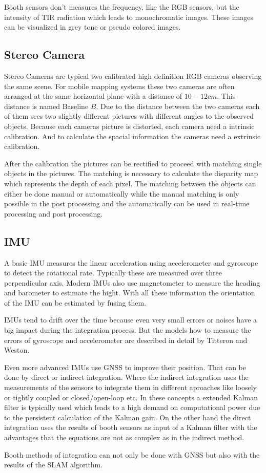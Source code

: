 Booth sensors don't measures the frequency, like the RGB sensors, but the intensity of \ac{TIR} radiation which leads to monochromatic images.
These images can be visualized in grey tone or pseudo colored images.

\subsection{Stereo Camera}\label{ssec:stereoCamera}
Stereo Cameras are typical two calibrated high definition RGB cameras observing the same scene.
For mobile mapping systems these two cameras are often arranged at the same horizontal plane with a distance of $10-12\si{cm}$.
This distance is named Baseline $B$.
Due to the distance between the two cameras each of them sees two slightly different pictures with different angles to the observed objects.
Because each cameras picture is distorted, each camera need a intrinsic calibration.
And to calculate the spacial information the cameras need a extrinsic calibration.

After the calibration the pictures can be rectified to proceed with matching single objects in the pictures.
The matching is necessary to calculate the disparity map which represents the depth of each pixel.
The matching between the objects can either be done manual or automatically while the manual matching is only possible in the post processing and the automatically can be used in real-time processing and post processing\cite{Zarchang2000}.

\subsection{IMU}\label{ssec:imu}

A basic \ac{IMU} measures the linear acceleration using accelerometer and gyroscope to detect the rotational rate.
Typically these are measured over three perpendicular axis.
Modern \ac{IMU}s also use magnetometer to measure the heading and barometer to estimate the hight.
With all these information the orientation of the \ac{IMU} can be estimated by fusing them\cite{kim2004}.

\ac{IMU}s tend to drift over the time because even very small errors or noises have a big impact during the integration process.
But the models how to measure the errors of gyroscope and accelerometer are described in detail by Titteron and Weston\cite{titterton2005}.

Even more advanced \ac{IMU}s use \ac{GNSS} to improve their position.
That can be done by direct or indirect integration.
Where the indirect integration uses the measurements of the sensors to integrate them in different aproaches like loosely or tightly coupled or closed/open-loop etc.
In these concepts a extended Kalman filter is typically used which leads to a high demand on computational power due to the persistent calculation of the Kalman gain.
On the other hand the direct integration uses the results of booth sensors as input of a Kalman filter with the advantages that the equations are not as complex as in the indirect method\cite{Qi2002}.

Booth methods of integration can not only be done with \ac{GNSS} but also with the results of the \ac{SLAM} algorithm.

